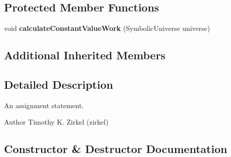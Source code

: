 \subsection*{Protected Member Functions}
\begin{DoxyCompactItemize}
\item 
\hypertarget{classedu_1_1udel_1_1cis_1_1vsl_1_1civl_1_1model_1_1common_1_1statement_1_1CommonAssignStatement_a9250b84cd48fbbbfe9503f7a231d91ea}{}void {\bfseries calculate\+Constant\+Value\+Work} (Symbolic\+Universe universe)\label{classedu_1_1udel_1_1cis_1_1vsl_1_1civl_1_1model_1_1common_1_1statement_1_1CommonAssignStatement_a9250b84cd48fbbbfe9503f7a231d91ea}

\end{DoxyCompactItemize}
\subsection*{Additional Inherited Members}


\subsection{Detailed Description}
An assignment statement. 

\begin{DoxyAuthor}{Author}
Timothy K. Zirkel (zirkel) 
\end{DoxyAuthor}


\subsection{Constructor \& Destructor Documentation}
\hypertarget{classedu_1_1udel_1_1cis_1_1vsl_1_1civl_1_1model_1_1common_1_1statement_1_1CommonAssignStatement_a55ad81e9d3932fe6e874b6168cb365c2}{}
